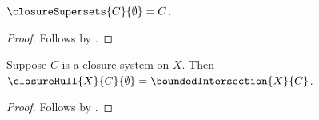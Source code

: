 \begin{proposition}\label{empty_closure_supersets}
    $\closureSupersets{C}{\emptyset}=C$.
\end{proposition}
\begin{proof}
    Follows by
        .
\end{proof}

\begin{proposition}\label{closure_hull_empty}
    Suppose $C$ is a closure system on $X$.
    Then
        $\closureHull{X}{C}{\emptyset}
            =\boundedIntersection{X}{C}$.
\end{proposition}
\begin{proof}
    Follows by
        .
\end{proof}
